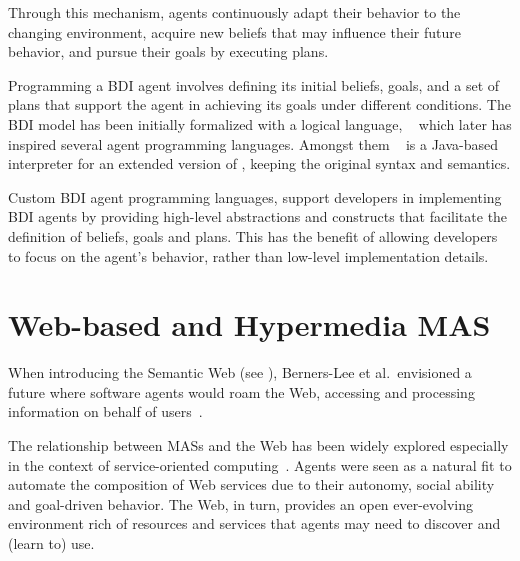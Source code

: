 Through this mechanism, agents continuously adapt their behavior to the changing environment, acquire new beliefs that may influence their future behavior, and pursue their goals by executing plans.

Programming a \ac{BDI} agent involves defining its initial beliefs, goals, and a set of plans that support the agent in achieving its goals under different conditions. 
%
The \ac{BDI} model has been initially formalized with a logical language, \agentspeak{}~\cite{raoagentspeak} which later has inspired several agent programming languages. 
%
Amongst them \jason{}~\cite{Bordini_Hübner_Wooldridge_2007} is a Java-based interpreter for an extended version of \agentspeak{}, keeping the original syntax and semantics.

Custom \ac{BDI} agent programming languages, support developers in implementing \ac{BDI} agents by providing high-level abstractions and constructs that facilitate the definition of beliefs, goals and plans. 
%
This has the benefit of allowing developers to focus on the agent's behavior, rather than low-level implementation details. 





\section{Web-based and Hypermedia \acs{MAS}}
\label{sec:back:mas:web}

When introducing the Semantic Web (see ), Berners-Lee et al.\ envisioned a future where software agents would roam the Web, accessing and processing information on behalf of users~\cite{berners2023semantic,Hendler_2001}.

The relationship between \acp{MAS} and the Web has been widely explored especially in the context of service-oriented computing~\cite{Singh2004}.
%
Agents were seen as a natural fit to automate the composition of Web services due to their autonomy, social ability and goal-driven behavior.
%
The Web, in turn, provides an open ever-evolving environment rich of resources and services that agents may need to discover and (learn to) use. 

